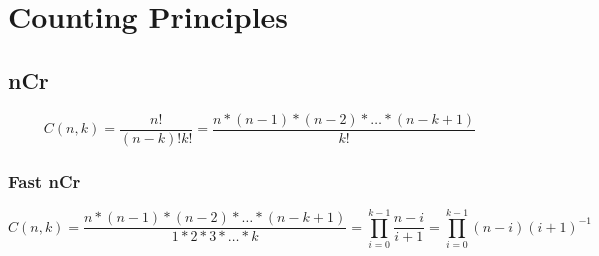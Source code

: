 \section{Counting Principles}
	\subsection{nCr}
		\[
		C(n,k) = \dfrac{n!}{(n-k)!k!} = \dfrac{n*(n-1)*(n-2)*\ldots*(n-k+1)}{k!}
		\]

		\subsubsection{Fast nCr}
			\[
			C(n,k) = \dfrac{n*(n-1)*(n-2)*\ldots*(n-k+1)}{1*2*3*\ldots*k} = \prod\limits_{i=0}^{k-1} \dfrac{n-i}{i+1} = \prod\limits_{i=0}^{k-1} (n-i)(i+1)^{-1}
    			\]


